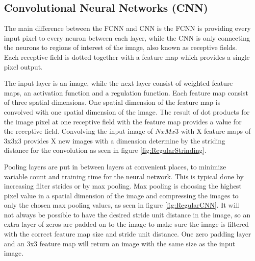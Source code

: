 \FloatBarrier

\subsection{Convolutional Neural Networks (CNN)}

The main difference between the FCNN and CNN is the FCNN is providing every input pixel to every neuron between each layer, while the CNN is only connecting the neurons to regions of interest of the image, also known as receptive fields. Each receptive field is dotted together with a feature map which provides a single pixel output.

The input layer is an image, while the next layer consist of weighted feature maps, an activation function and a regulation function. Each feature map consist of three spatial dimensions. One spatial dimension of the feature map is convolved with one spatial dimension of the image. The result of dot products for the image pixel at one receptive field with the feature map provides a value for the receptive field. Convolving the input image of  $NxMx3$ with X feature maps of 3x3x3 provides X new images with a dimension determine by the striding distance for the convolution as seen in figure \ref{fig:RegularStrinding}.

\FloatBarrier

Pooling layers are put in between layers at convenient places, to minimize variable count and training time for the neural network. This is typical done by increasing filter strides or by max pooling. Max pooling is choosing the highest pixel value in a spatial dimension of the image and compressing the images to only the chosen max pooling values, as seen in figure \ref{fig:RegularCNN}. It will not always be possible to have the desired stride unit distance in the image, so an extra layer of zeros are padded on to the image to make sure the image is filtered with the correct feature map size and stride unit distance. One zero padding layer and an 3x3 feature map will return an image with the same size as the input image.

\FloatBarrier